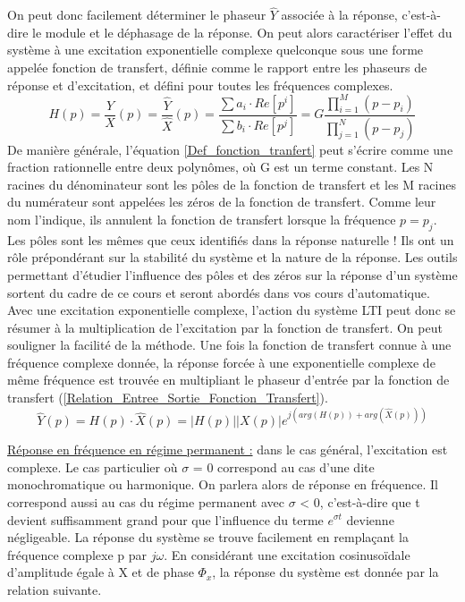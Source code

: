 \documentclass[]{book}
\begin{document}
{	On peut donc facilement déterminer le phaseur $\hat{Y}$ associée à la réponse, c'est-à-dire le module et le déphasage de la réponse. 
	On peut alors caractériser l'effet du système à une excitation exponentielle complexe quelconque sous une forme appelée fonction de transfert, définie comme le rapport entre les phaseurs de réponse et d'excitation, et défini pour toutes les fréquences complexes. 
	\begin{equation}\label{Def_fonction_tranfert}
	H(p) = \frac{Y}{X} (p) = \frac{\hat Y}{\hat X} (p)= \frac{\sum a_{i} \cdot Re[p^{i}]}{\sum b_{i} \cdot Re[p^{j}]}=G\frac{\prod_{i=1}^{M} (p-p_{i})}{\prod_{j=1}^{N} (p-p_{j})}
	\end{equation}
	De manière générale, l'équation \ref{Def_fonction_tranfert} peut s'écrire comme une fraction rationnelle entre deux polynômes, où G est un terme constant. Les N racines du dénominateur sont les pôles de la fonction de transfert et les M racines du numérateur sont appelées les zéros de la fonction de transfert. Comme leur nom l'indique, ils annulent la fonction de transfert lorsque la fréquence $p=p_{j}$. Les pôles sont les mêmes que ceux identifiés dans la réponse naturelle ! Ils ont un rôle prépondérant sur la stabilité du système et la nature de la réponse. Les outils permettant d'étudier l'influence des pôles et des zéros sur la réponse d'un système sortent du cadre de ce cours et seront abordés dans vos cours d'automatique.\\
	
	Avec une excitation exponentielle complexe, l'action du système LTI peut donc se résumer à la multiplication de l'excitation par la fonction de transfert.
	On peut souligner la facilité de la méthode. Une fois la fonction de transfert connue à une fréquence complexe donnée, la réponse forcée à une exponentielle complexe de même fréquence est trouvée en multipliant le phaseur d'entrée par la fonction de transfert (\ref{Relation_Entree_Sortie_Fonction_Transfert}).
	\begin{equation}\label{Relation_Entree_Sortie_Fonction_Transfert}
	\hat{Y}(p) = H(p)\cdot \hat{X}(p)=|H(p)||X(p)|e^{j(arg(H(p))+arg(\hat{X}(p)))}	
	\end{equation}
	
	\vspace{1\baselineskip}
	
	
	\underline{Réponse en fréquence en régime permanent :} 
	dans le cas général, l'excitation est complexe. Le cas particulier où $\sigma$ = 0 correspond au cas d'une dite monochromatique ou harmonique. On parlera alors de réponse en fréquence. Il correspond aussi au cas du régime permanent avec $\sigma$ < 0, c'est-à-dire que t devient suffisamment grand pour que l'influence du terme $e^{\sigma t}$ devienne négligeable. 
	La réponse du système se trouve facilement en remplaçant la fréquence complexe p par $j\omega$. En considérant une excitation cosinusoïdale d'amplitude égale à X et de phase $\Phi_{x}$, la réponse du système est donnée par la relation suivante.
	
}
\end{document}

